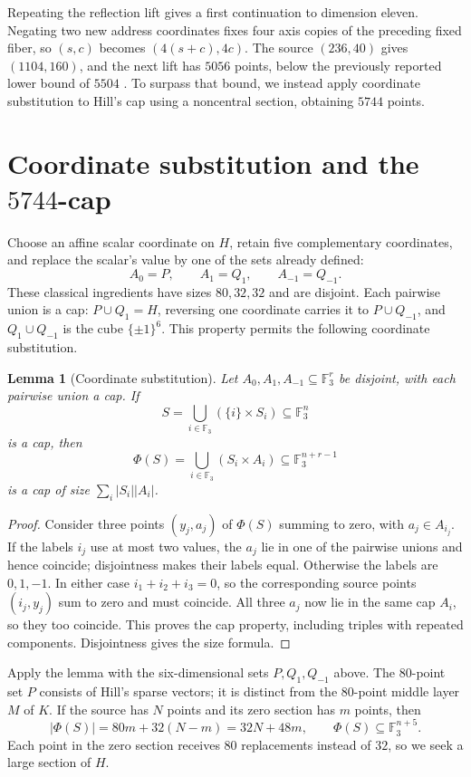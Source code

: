 \documentclass[11pt]{article}
\newcommand{\F}{\mathbb F_3}
\newtheorem{lemma}[theorem]{Lemma}
\begin{document}
Repeating the reflection lift gives a first continuation to dimension
eleven. Negating two new address coordinates fixes four axis copies of
the preceding fixed fiber, so $(s,c)$ becomes $(4(s+c),4c)$. The source
$(236,40)$ gives $(1104,160)$, and the next lift has $5056$ points,
below the previously reported lower bound of $5504$ \cite[Corollary 2]{karapetyan}.
To surpass that bound, we instead apply coordinate substitution to Hill's cap
using a noncentral section, obtaining $5744$ points.

\section{Coordinate substitution and the $5744$-cap}\label{sec:substitution}

Choose an affine scalar coordinate on $H$, retain five complementary
coordinates, and replace the scalar's value by one of the sets already defined:
\[
 A_0=P,\qquad A_1=Q_1,\qquad A_{-1}=Q_{-1}.
\]
These classical ingredients \cite[Section 3]{extended} have sizes
$80,32,32$ and are disjoint. Each pairwise union is a cap:
$P\cup Q_1=H$, reversing one coordinate carries it to $P\cup Q_{-1}$,
and $Q_1\cup Q_{-1}$ is the cube $\{\pm1\}^6$.
This property permits the following coordinate substitution.

\begin{lemma}[Coordinate substitution]\label{lem:substitution}
Let $A_0,A_1,A_{-1}\subseteq\F^r$ be disjoint, with each pairwise union
a cap. If
\[
 S=\bigcup_{i\in\F}(\{i\}\times S_i)\subseteq\F^n
\]
is a cap, then
\[
 \Phi(S)=\bigcup_{i\in\F}(S_i\times A_i)\subseteq\F^{n+r-1}
\]
is a cap of size $\sum_i|S_i||A_i|$.
\end{lemma}
\begin{proof}
Consider three points $(y_j,a_j)$ of $\Phi(S)$ summing to zero, with
$a_j\in A_{i_j}$. If the labels $i_j$ use at most two values, the $a_j$
lie in one of the pairwise unions and hence coincide; disjointness makes their
labels equal. Otherwise the labels are $0,1,-1$. In either case
$i_1+i_2+i_3=0$, so the corresponding source points $(i_j,y_j)$ sum to
zero and must coincide. All three $a_j$ now lie in the same cap $A_i$,
so they too coincide. This proves the cap property, including triples
with repeated components. Disjointness gives the size formula.
\end{proof}

Apply the lemma with the six-dimensional sets $P,Q_1,Q_{-1}$ above.
The $80$-point set $P$ consists of Hill's sparse vectors; it is distinct
from the $80$-point middle layer $M$ of $K$.
If the source has $N$ points and its zero section has $m$ points, then
\begin{equation}\label{eq:substitution-size}
 |\Phi(S)|=80m+32(N-m)=32N+48m,
 \qquad \Phi(S)\subseteq\F^{n+5}.
\end{equation}
Each point in the zero section receives $80$ replacements instead of
$32$, so we seek a large section of $H$.
\end{document}
